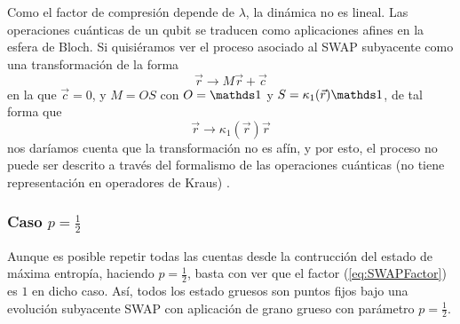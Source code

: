 Como el factor de compresión depende de $\lambda$, la dinámica no es lineal. Las operaciones cuánticas de un qubit se traducen como aplicaciones afines en la esfera de Bloch. Si quisiéramos ver el proceso asociado al \textsc{SWAP} subyacente como una transformación de la forma
\begin{equation*}
  \vec{r}\rightarrow M\vec{r}+\vec{c}
\end{equation*}
en la que $\vec{c}=0$, y $M=OS$ con $O=\Id$ y $S=\kappa_{1}(\vec{r})\Id$, de tal forma que
\begin{equation*}
  \vec{r}\rightarrow \kappa_{1}(\vec{r})\vec{r}
\end{equation*}
nos daríamos cuenta que la transformación no es afín, y por esto, el proceso no puede ser descrito a través del formalismo de las operaciones cuánticas (no tiene representación en operadores de Kraus) \cite{Chuang}.
\subsubsection{Caso $p=\frac{1}{2}$}

Aunque es posible repetir todas las cuentas desde la contrucción del estado de máxima entropía, haciendo $p=\frac{1}{2}$, basta con ver que el factor (\eqref{eq:SWAPFactor}) es $1$ en dicho caso. Así, todos los estado gruesos son puntos fijos bajo una evolución subyacente SWAP con aplicación de grano grueso con parámetro $p=\frac{1}{2}$.

